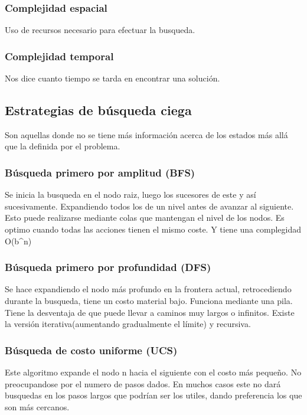 \documentclass{article}
\begin{document}
\subsubsection{Complejidad espacial }

Uso de recursos necesario para efectuar la busqueda.

\subsubsection{Complejidad temporal }

Nos dice cuanto tiempo se tarda en encontrar una solución. 

\subsection{Estrategias de búsqueda ciega }

Son aquellas donde no se tiene más información acerca de los estados más allá que la definida por el problema.

\subsubsection{Búsqueda primero por amplitud (BFS)}

Se inicia la busqueda en el nodo raiz, luego los sucesores de este y así sucesivamente. Expandiendo todos los de un nivel antes de avanzar al siguiente. Esto puede realizarse mediante colas que mantengan el nivel de los nodos. Es optimo cuando todas las acciones tienen el mismo coste. Y tiene una complegidad O(b^n)

\subsubsection{Búsqueda primero por profundidad (DFS)}

Se hace expandiendo el nodo más profundo en la frontera actual, retrocediendo durante la busqueda, tiene un costo material bajo. Funciona mediante una pila. Tiene la desventaja de que puede llevar a caminos muy largos o infinitos. Existe la versión iterativa(aumentando gradualmente el límite) y recursiva. 

\subsubsection{Búsqueda de costo uniforme (UCS)}

Este algoritmo expande el nodo n hacia el siguiente con el costo más pequeño. No preocupandose por el numero de pasos dados. En muchos casos este no dará busquedas en los pasos largos que podrían ser los utiles, dando preferencia los que son más cercanos.
\end{document}
